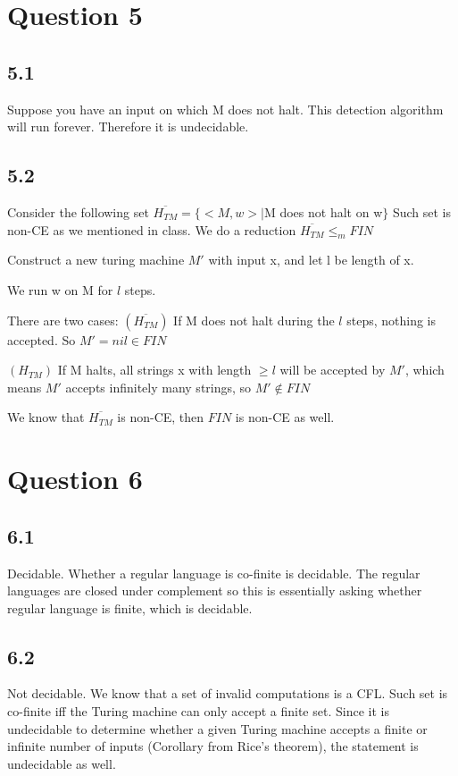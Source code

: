 \documentclass[a4paper, 11pt]{article}
\begin{document}
\section*{Question 5}
\subsection*{5.1}
Suppose you have an input on which M does not halt. This detection algorithm will run forever. Therefore it is undecidable.
\subsection*{5.2}
Consider the following set $\overline {H_{TM}}=\{<M,w> | $M does not halt on w$\}$ Such set is non-CE as we mentioned in class. 
We do a reduction $\overline {H_{TM}} \leq_m  FIN$

Construct a new turing machine $M'$ with input x, and let l be length of x. 

We run w on M for $l$ steps.

There are two cases: $(\overline{H_{TM}})$ If M does not halt during the $l$ steps, nothing is accepted. So $M'=nil\in FIN$

$(H_{TM})$ If M halts, all strings x with length $\geq l$ will be accepted by $M'$, which means $M'$ accepts infinitely many strings, so $M' \notin FIN$

We know that $\overline {H_{TM}}$ is non-CE, then $FIN$ is non-CE as well.


\section*{Question 6}
\subsection*{6.1}
Decidable. Whether a regular language is co-finite is decidable. The regular languages are closed under complement so this is essentially asking whether regular language is finite, which is decidable.
\subsection*{6.2}
Not decidable. We know that a set of invalid computations is a CFL. Such set is co-finite iff the Turing machine can only accept a finite set. Since it is undecidable to determine whether a given Turing machine accepts a finite or infinite number of inputs (Corollary from Rice's theorem), the statement is undecidable as well.
\end{document}
